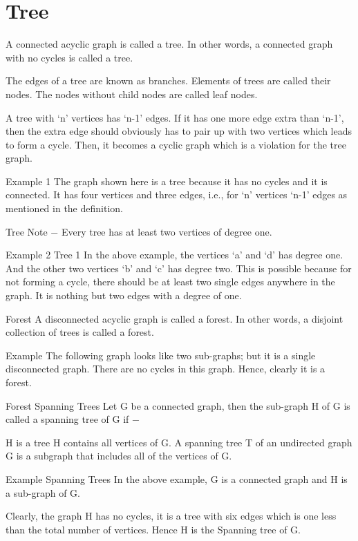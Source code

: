 



\section{Tree}
A connected acyclic graph is called a tree. In other words, a connected graph with no cycles is called a tree.

The edges of a tree are known as branches. Elements of trees are called their nodes. The nodes without child nodes are called leaf nodes.

A tree with ‘n’ vertices has ‘n-1’ edges. If it has one more edge extra than ‘n-1’, then the extra edge should obviously has to pair up with two vertices which leads to form a cycle. Then, it becomes a cyclic graph which is a violation for the tree graph.

Example 1
The graph shown here is a tree because it has no cycles and it is connected. It has four vertices and three edges, i.e., for ‘n’ vertices ‘n-1’ edges as mentioned in the definition.

Tree
Note − Every tree has at least two vertices of degree one.

Example 2
Tree 1
In the above example, the vertices ‘a’ and ‘d’ has degree one. And the other two vertices ‘b’ and ‘c’ has degree two. This is possible because for not forming a cycle, there should be at least two single edges anywhere in the graph. It is nothing but two edges with a degree of one.

Forest
A disconnected acyclic graph is called a forest. In other words, a disjoint collection of trees is called a forest.

Example
The following graph looks like two sub-graphs; but it is a single disconnected graph. There are no cycles in this graph. Hence, clearly it is a forest.

Forest
Spanning Trees
Let G be a connected graph, then the sub-graph H of G is called a spanning tree of G if −

H is a tree
H contains all vertices of G.
A spanning tree T of an undirected graph G is a subgraph that includes all of the vertices of G.

Example
Spanning Trees
In the above example, G is a connected graph and H is a sub-graph of G.

Clearly, the graph H has no cycles, it is a tree with six edges which is one less than the total number of vertices. Hence H is the Spanning tree of G.

